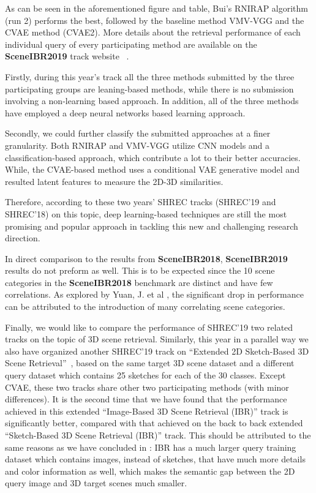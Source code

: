 \documentclass[../main.tex]{subfiles}
\begin{document}
As can be seen in the aforementioned figure and table, Bui's RNIRAP algorithm 
(run 2) performs the best, followed by the baseline method VMV-VGG and the CVAE 
method (CVAE2). More details about the retrieval performance of each individual 
query of every participating method are available on the \textbf{SceneIBR2019} 
track website~\cite{SceneIBR19} . 

Firstly, during this year's track all the three methods submitted by the three 
participating groups are leaning-based methods, while there is no submission 
involving a non-learning based approach. In addition, all of the three methods 
have employed a deep neural networks based learning approach. 

Secondly, we could further classify the submitted approaches at a finer granularity. Both RNIRAP and VMV-VGG utilize CNN models and a classification-based approach, which contribute a lot to their better accuracies. While, the CVAE-based method uses a conditional VAE generative model and resulted latent features to measure the 2D-3D similarities. 

Therefore, according to these two years' SHREC tracks (SHREC'19 and SHREC'18) on this topic, deep learning-based techniques are still the most promising and popular approach in tackling this new and challenging research direction.

In direct comparison to the results from \textbf{SceneIBR2018}, 
\textbf{SceneIBR2019} results do not preform as well. This is to be expected 
since the 10 scene categories in the \textbf{SceneIBR2018} benchmark are
distinct and have few correlations. As explored by Yuan, J. et al \cite{MIPR}, 
the significant drop in performance can be attributed to the introduction of 
many correlating scene categories. 


Finally, we would like to compare the performance of SHREC'19 two related 
tracks on the topic of 3D scene retrieval. Similarly, this year in a parallel 
way we also have organized another SHREC'19 track on ``Extended 2D Sketch-Based 
3D Scene Retrieval''~\cite{SceneIBR19}, based on the same target 3D scene 
dataset and a different query dataset which contains 25 sketches for each of 
the 30 classes. Except CVAE, these two tracks share other two participating 
methods (with minor differences). It is the second time 
that we have found that the performance achieved in this 
extended ``Image-Based 3D Scene Retrieval 
(IBR)'' track is significantly better, compared with that achieved on the back 
to back extended ``Sketch-Based 3D Scene Retrieval (IBR)'' track. This should 
be attributed to the same reasons as we 
have concluded in \cite{SceneIBR18Journal, SceneIBR18Website}: IBR has a 
much larger query training dataset which contains images, instead of sketches, 
that have much more details and color information as well, which makes the 
semantic gap between the 2D query image and 3D target scenes much smaller.  
\end{document}
